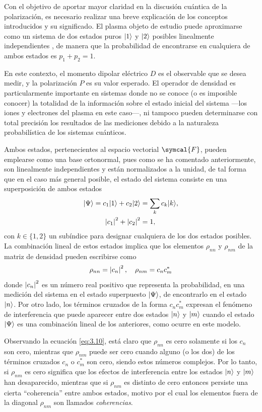 Con el objetivo de aportar mayor claridad en la discusión cuántica de la polarización, es necesario realizar una breve explicación de los conceptos introducidos y su significado. El plasma objeto de estudio puede aproximarse \autocite{Milonni1988} como un sistema de dos estados puros $|1\rangle$ y $|2\rangle$ posibles linealmente independientes \autocite{Cohen-Tannoudji2019}, de manera que la probabilidad de encontrarse en cualquiera de ambos estados es $p_{1} + p_{2} = 1$.

En este contexto, el momento dipolar eléctrico $D$ es el observable que se desea medir, y la polarización $P$ es su valor esperado. El operador de densidad es particularmente importante en sistemas donde no se conoce (o es imposible conocer) la totalidad de la información sobre el estado inicial del sistema ---los iones y electrones del plasma en este caso---, ni tampoco pueden determinarse con total precisión los resultados de las mediciones debido a la naturaleza probabilística de los sistemas cuánticos. 

Ambos estados, pertenecientes al espacio vectorial $\symcal{F}$, pueden emplearse como una base ortonormal, pues como se ha comentado anteriormente, son linealmente independientes y están normalizados a la unidad, de tal forma que en el caso más general posible, el estado del sistema consiste en una superposición de ambos estados
\begin{align}
  |\Psi\rangle = c_{1}|1\rangle + c_{2}|2\rangle &= \sum_{k} c_{k}|k\rangle, \\
  \left|c_{1}\right|^{2} + \left|c_{2}\right|^{2} &= 1,
\end{align}
con $k \in \{1,2\}$ un subíndice para designar cualquiera de los dos estados posibles. La combinación lineal de estos estados implica que los elementos $\rho_{nn}$ y $\rho_{nm}$ de la matriz de densidad pueden escribirse como
\begin{equation}\label{eq:3.10}
  \rho_{nn} = \left|c_{n}\right|^{2}, \quad 
  \rho_{nm} = c_{n}c^{*}_{m}
\end{equation}
donde $\left|c_{n}\right|^{2}$ es un número real positivo que representa la probabilidad, en una medición del sistema en el estado superpuesto $|\Psi\rangle$, de encontrarlo en el estado $|n\rangle$. Por otro lado, los términos cruzados de la forma $c_{n}c^{*}_{m}$ expresan el fenómeno de interferencia que puede aparecer entre dos estados $|n\rangle$ y $|m\rangle$ cuando el estado $|\Psi\rangle$ es una combinación lineal de los anteriores, como ocurre en este modelo. 

Observando la ecuación \eqref{eq:3.10}, está claro que $\rho_{nn}$ es cero solamente si los $c_{n}$ son cero, mientras que $\rho_{nm}$ puede ser cero cuando alguno (o los dos) de los términos cruzados $c_{n}$ o $c^{*}_{m}$ son cero, siendo estos números complejos. Por lo tanto, si $\rho_{nm}$ es cero significa que los efectos de interferencia entre los estados $|n\rangle$ y $|m\rangle$ han desaparecido, mientras que si $\rho_{nm}$ es distinto de cero entonces persiste una cierta \enquote{coherencia} entre ambos estados, motivo por el cual los elementos fuera de la diagonal $\rho_{nm}$ son llamados \emph{coherencias}.

